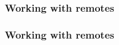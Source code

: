 \documentclass{beamer}
\begin{document}
    \begin{frame}
        \frametitle{Working with remotes}
        \begin{figure}[H]
            \centering
            \noindent
        \end{figure}
    \end{frame}
    \begin{frame}
        \frametitle{Working with remotes}
        \begin{figure}[H]
            \centering
            \noindent
        \end{figure}
    \end{frame}
\end{document}
